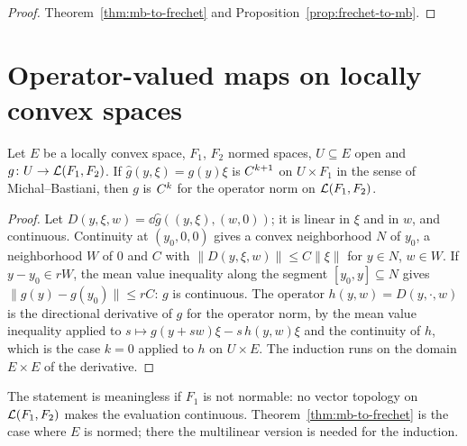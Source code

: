 \begin{proof}
  \leanok
  Theorem~\ref{thm:mb-to-frechet} and Proposition~\ref{prop:frechet-to-mb}.
\end{proof}

\section{Operator-valued maps on locally convex spaces}

\begin{theorem}
  \label{thm:operator-valued}
  \leanok
  Let $E$ be a locally convex space, $F_1$, $F_2$ normed spaces, $U \subseteq E$ open and
  $g \colon U \to \mathcal{L}(F_1, F_2)$. If $\hat g(y, \xi) = g(y)\xi$ is $C^{k+1}$ on $U \times F_1$
  in the sense of Michal--Bastiani, then $g$ is $C^{k}$ for the operator norm on
  $\mathcal{L}(F_1, F_2)$.
\end{theorem}

\begin{proof}
  \leanok
  Let $D(y, \xi, w) = \dd\hat g((y, \xi), (w, 0))$; it is linear in $\xi$ and in $w$, and
  continuous. Continuity at $(y_0, 0, 0)$ gives a convex neighborhood $N$ of $y_0$, a
  neighborhood $W$ of $0$ and $C$ with $\|D(y, \xi, w)\| \le C\|\xi\|$ for $y \in N$,
  $w \in W$. If $y - y_0 \in rW$, the mean value inequality along the segment
  $[y_0, y] \subseteq N$ gives $\|g(y) - g(y_0)\| \le rC$: $g$ is continuous. The operator
  $h(y, w) = D(y, \cdot, w)$ is the directional derivative of $g$ for the operator norm, by the
  mean value inequality applied to $s \mapsto g(y + sw)\xi - s\,h(y, w)\xi$ and the continuity of
  $h$, which is the case $k = 0$ applied to $h$ on $U \times E$. The induction runs on the domain
  $E \times E$ of the derivative.
\end{proof}

The statement is meaningless if $F_1$ is not normable: no vector topology on $\mathcal{L}(F_1, F_2)$
makes the evaluation continuous. Theorem~\ref{thm:mb-to-frechet} is the case where $E$ is normed;
there the multilinear version is needed for the induction.

